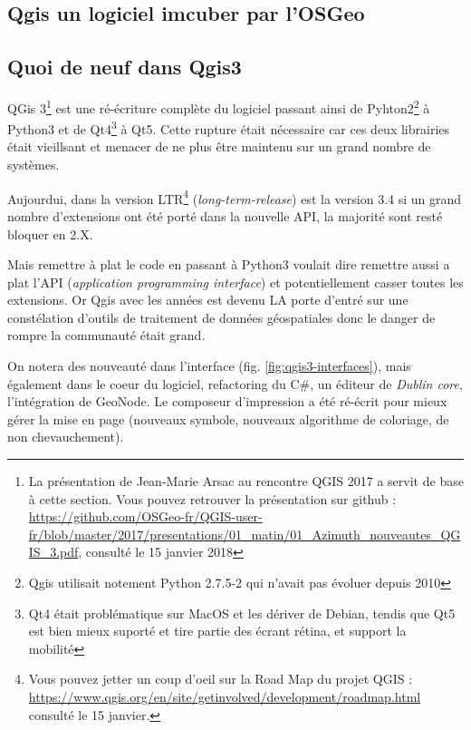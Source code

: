 \documentclass[a4paper, 11pt]{article}
\begin{document}
  \subsection{Qgis un logiciel imcuber par l'OSGeo}

  \subsection{Quoi de neuf dans Qgis3}
  QGis 3\footnote{La présentation de Jean-Marie Arsac au rencontre QGIS 2017 a servit de base à cette section. Vous pouvez retrouver la présentation sur github : \url{https://github.com/OSGeo-fr/QGIS-user-fr/blob/master/2017/presentations/01_matin/01_Azimuth_nouveautes_QGIS_3.pdf}, consulté le 15 janvier 2018} est une ré-écriture complète du logiciel passant ainsi de Pyhton2\footnote{Qgis utilisait notement Python 2.7.5-2 qui n'avait pas évoluer depuis 2010} à Python3 et de Qt4\footnote{Qt4 était problématique sur MacOS et les dériver de Debian, tendis que Qt5 est bien mieux suporté et tire partie des écrant rétina, et support la mobilité} à Qt5. Cette rupture était nécessaire car ces deux librairies était vieillsant et menacer de ne plus être maintenu sur un grand nombre de systèmes.

  Aujourdui, dans la version LTR\footnote{Vous pouvez jetter un coup d'oeil sur la Road Map du projet QGIS : \url{https://www.qgis.org/en/site/getinvolved/development/roadmap.html} consulté le 15 janvier.} (\textit{long-term-release}) est la version 3.4 si un grand nombre d'extensions ont été porté dans la nouvelle API, la majorité sont resté bloquer en 2.X.

  Mais remettre à plat le code en passant à Python3 voulait dire remettre aussi a plat l'API (\textit{application programming interface}) et potentiellement casser toutes les extensions. Or Qgis avec les années est devenu LA porte d'entré sur une constélation d'outils de traitement de données géospatiales donc le danger de rompre la communauté était grand.

  On notera des nouveauté dans l'interface (fig. \ref{fig:qgis3-interfaces}), mais également dans le coeur du logiciel, refactoring du C\#, un éditeur de \textit{Dublin core}, l'intégration de GeoNode. Le composeur d'impression a été ré-écrit pour mieux gérer la mise en page (nouveaux symbole, nouveaux algorithme de coloriage, de non chevauchement).
\end{document}
